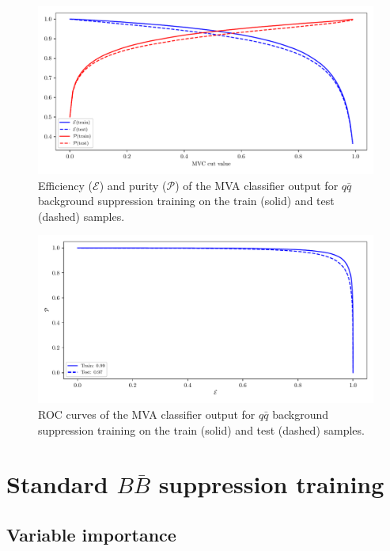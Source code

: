\begin{figure}[H]
\centering
\captionsetup{width=0.8\linewidth}
\includegraphics[width=\linewidth]{fig/addendums/QQcC_effpur}
\caption{Efficiency ($\mathcal{E}$) and purity ($\mathcal{P}$) of the MVA classifier output for $q\bar q$ background suppression training on the train (solid) and test (dashed) samples.}
\end{figure}

\begin{figure}[H]
\centering
\captionsetup{width=0.8\linewidth}
\includegraphics[width=\linewidth]{fig/addendums/QQcC_roc}
\caption{ROC curves of the MVA classifier output for $q\bar q$ background suppression training on the train (solid) and test (dashed) samples.}
\end{figure}

\section*{Standard $B \bar B$ suppression training}

\subsection*{Variable importance}

